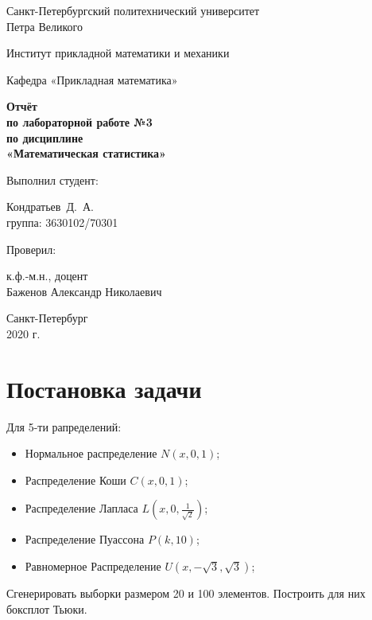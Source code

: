 \documentclass[12pt,a4paper]{article}
\begin{document}
	\begin{titlepage}
		\begin{center}			
			Санкт-Петербургский политехнический университет\\
			Петра Великого
			\vspace{0.25cm}
			
			Институт прикладной математики и механики
			
			Кафедра «Прикладная математика»
			\vfill
			
			\textbf{Отчёт\\
				по лабораторной работе №3\\
				по дисциплине\\
				«Математическая статистика»}\\[5mm]
			\bigskip
		\end{center}
		\vfill
		
		\hfill\begin{minipage}{0.45\textwidth}
			Выполнил студент:
			\vspace{0.2cm}
			
			Кондратьев~Д.~А.\\
			группа: 3630102/70301
		\end{minipage}%
		\bigskip
		
		\hfill\begin{minipage}{0.45\textwidth}
			Проверил:
			\vspace{0.2cm}
			
			к.ф.-м.н., доцент\\
			Баженов Александр Николаевич
		\end{minipage}%
		\vfill
		
		\begin{center}
			Санкт-Петербург\\
			2020 г.
		\end{center}
	\end{titlepage}
	
	
	
	\tableofcontents{}
	\listoftables
	\listoffigures
	
	\newpage
	\section{Постановка задачи}
	
	Для 5-ти рапределений:
	\begin{itemize}
		\item Нормальное распределение $N(x,0,1)$;
		\item Распределение Коши $C(x,0,1)$;
		\item Распределение Лапласа $L( x,0,\frac{1}{\sqrt{2}})$;
		\item Распределение Пуассона $P(k, 10)$;
		\item Равномерное Распределение $U(x,-\sqrt{3}, \sqrt{3})$;
	\end{itemize}
	Сгенерировать выборки размером 20 и 100 элементов. Построить для них боксплот Тьюки.
	
\end{document}
